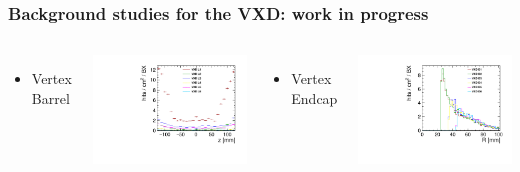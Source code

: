 \documentclass[aspectratio=169, hyperref={colorlinks=true,pdfpagelabels=false,linkcolor=black}, xcolor=dvipsnames,10pt]{beamer}
\begin{document}
\begin{frame}
	\frametitle{Background studies for the VXD: work in progress}

	
	\begin{columns}
		\begin{itemize}
		\item Vertex Barrel
		\end{itemize}
		\centering
		\includegraphics[width=\textwidth]{../figures/occupancy_VXD_barrel.pdf}
		
		\begin{itemize}
		\item Vertex Endcap
		\end{itemize}
		\centering
		\includegraphics[width=\textwidth]{../figures/occupancy_VXD_endcap.pdf}
	\end{columns}
	

\end{frame}
\end{document}
